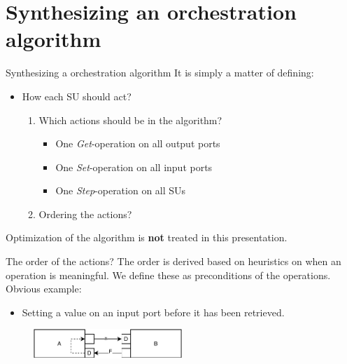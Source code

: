 \documentclass{beamer}
\begin{document}
\section{Synthesizing an orchestration algorithm}
\begin{frame}{Synthesizing a orchestration algorithm}
    It is simply a matter of defining:
    \begin{itemize}
        \item How each SU should act?
        \begin{enumerate}
            \item Which actions should be in the algorithm?
            \begin{itemize}
                \item One \textit{Get}-operation on all output ports
                \item One \textit{Set}-operation on all input ports
                \item One \textit{Step}-operation on all SUs
            \end{itemize}
            \item Ordering the actions?
        \end{enumerate}
    \end{itemize}
    Optimization of the algorithm is \textbf{not} treated in this presentation.
\end{frame}

\begin{frame}{The order of the actions?}
    The order is derived based on heuristics on when an operation is meaningful. We define these as preconditions of the operations.\\

    Obvious example:
    \begin{itemize}
        \item Setting a value on an input port before it has been retrieved.
    \end{itemize}
    \begin{figure}    
        \includegraphics[width=0.5\textwidth]{images/simple_example.pdf}
    \end{figure}
\end{frame}
\end{document}
